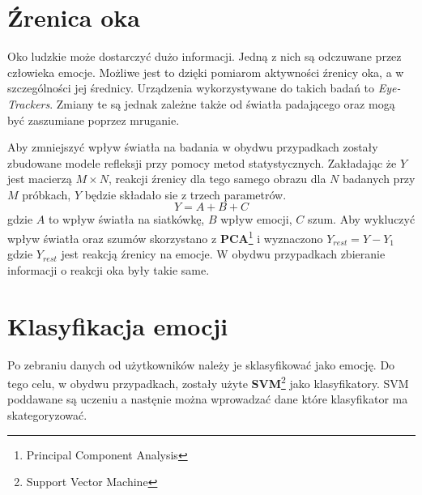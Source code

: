 \documentclass[10pt,journal,compsoc,twoside]{IEEEtran}
\begin{document}
\section{Źrenica oka}
Oko ludzkie może dostarczyć dużo informacji. Jedną z nich są odczuwane przez człowieka emocje. Możliwe jest to dzięki pomiarom aktywności źrenicy oka, a w szczególności jej średnicy. Urządzenia wykorzystywane do takich badań to \textit{Eye-Trackers}. Zmiany te są jednak zależne także od światła padającego oraz mogą być zaszumiane poprzez mruganie.
\newline\par Aby zmniejszyć wpływ światła na badania w obydwu przypadkach zostały zbudowane modele refleksji przy pomocy metod statystycznych.
Zakładając że $Y$ jest macierzą $M \times N$, reakcji źrenicy dla tego samego obrazu dla $N$ badanych przy $M$ próbkach, $Y$ będzie składało sie z trzech parametrów.
\begin{equation}
	Y = A + B + C
\end{equation}
gdzie $A$ to wpływ światła na siatkówkę, $B$ wpływ emocji, $C$ szum. Aby wykluczyć wpływ światła oraz szumów skorzystano z \textbf{PCA}\footnote{Principal Component Analysis} i wyznaczono $Y_{rest} = Y - Y_1$ gdzie $Y_{rest}$ jest reakcją źrenicy na emocje. W obydwu przypadkach zbieranie informacji o reakcji oka były takie same.
\section{Klasyfikacja emocji}
Po zebraniu danych od użytkowników należy je sklasyfikować jako emocję. Do tego celu, w obydwu przypadkach, zostały użyte \textbf{SVM}\footnote{Support Vector Machine} jako klasyfikatory. SVM poddawane są uczeniu a nastęnie  można wprowadzać dane które klasyfikator ma skategoryzować.
\end{document}
